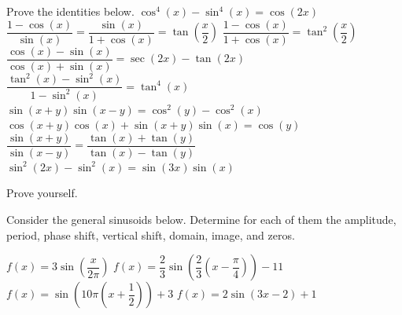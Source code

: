 \begin{Exercise} Prove the identities below.
    \Question[difficulty = 1] $\cos^4 (x) - \sin^4 (x) = \cos (2x)$
    \Question[difficulty = 1] $\dfrac{1-\cos (x)}{\sin(x)} = \dfrac{\sin (x)}{1+\cos (x)} = \tan\left(\dfrac{x}{2}\right)$
    \Question[difficulty = 1] $\dfrac{1-\cos (x)}{1+\cos (x)} = \tan^2\left(\dfrac{x}{2}\right)$
    \Question[difficulty = 2] $\dfrac{\cos (x)-\sin (x)}{\cos (x)+\sin (x)} = \sec (2x)-\tan (2x)$
    \Question[difficulty = 2] $\dfrac{\tan^2 (x) -\sin^2 (x) }{1-\sin^2 (x) }=\tan^4 (x) $
    \Question[difficulty = 1] $\sin( x + y )\sin( x - y )=\cos^2 (y) -\cos^2 (x) $
    \Question[difficulty = 1] $\cos( x + y )\cos (x) +\sin( x + y )\sin (x) =\cos (y) $
    \ifanalysis\Question[difficulty = 1]\fi\ifcalculus\Question[difficulty = 2]\fi $\dfrac{\sin( x + y )}{\sin( x - y )}=\dfrac{\tan (x) +\tan (y) }{\tan (x) -\tan (y) }$
    \ifanalysis\Question[difficulty = 1]\fi\ifcalculus\Question[difficulty = 2]\fi $\sin^2 (2x) -\sin^2 (x) =\sin (3x) \sin (x) $
    \EndCurrentQuestion

\end{Exercise}

\begin{Answer}\phantom{}
    Prove  yourself.
\end{Answer}

\ifcalculus\pagebreak\fi

\begin{Exercise} Consider the general sinusoids below. Determine for each of them the amplitude, period, phase shift, vertical shift, domain, image, and zeros.
    \begin{multicols}{2}
    	\Question[difficulty = 1] $f(x)= 3 \sin \left( \dfrac{x}{2 \pi} \right) $
    	\Question[difficulty = 1] $f(x)= \dfrac{2}{3} \sin \left(\dfrac{2}{3} \left( x-\dfrac{\pi}{4}  \right)\right) -11$
    	\Question[difficulty = 1] $f(x)= \sin \left(10 \pi \left( x+\dfrac{1}{2}  \right)\right)+3$
    	\ifanalysis\Question[difficulty = 1]\fi\ifcalculus\Question[difficulty = 2]\fi $f(x)= 2 \sin \left( 3x-2 \right)+1 $
    \EndCurrentQuestion
    \end{multicols}

\end{Exercise}

